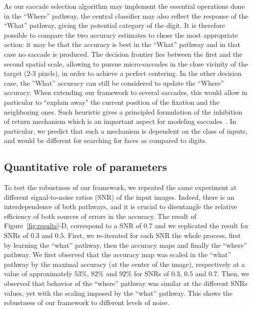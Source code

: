 As our saccade selection algorithm may implement the essential operations done in the ``Where'' pathway, the central classifier may also reflect the response of the ``What'' pathway, giving the potential category of the digit. It is therefore possible to compare the two accuracy estimates to chose the most appropriate action: it may be that the accuracy is best in the ``What'' pathway and in that case no saccade is produced. The decision frontier lies between the first and the second spatial scale, allowing to pursue micro-saccades in the close vicinity of the target (2-3 pixels), in order to achieve a perfect centering.  In the other decision case, the ''What'' accuracy can still be considered to update the ``Where'' accuracy. When extending our framework to several saccades, this would allow in particular to ``explain away" the current position of the fixation and the neighboring ones. Such heuristic gives a principled formulation of the inhibition of return mechanism which is an important aspect for modeling saccades~\citep{Itti01}. In particular, we predict that such a mechanism is dependent on the class of inputs, and would be different for searching for faces as compared to digits. 

\subsection{Quantitative role of parameters}
To test the robustness of our framework, we repeated the same experiment at different signal-to-noise ratios (SNR) of the input images. Indeed, there is an interdependence of both pathways, and it is crucial to disentangle the relative efficiency of both sources of errors in the accuracy.
The result of Figure~\ref{fig:results}-D, correspond to a SNR of $0.7$ and we replicated the result for SNRs of $0.3$ and $0.5$. First, we re-iterated for each SNR the whole process, first by learning the ``what'' pathway, then the accuracy maps and finally the ``where'' pathway. We first observed that the accuracy map was scaled in the ``what'' pathway by the maximal accuracy (at the center of the image), respectively at a value of approximately $53\%$, $82\%$ and $92\%$ for SNRs of $0.3$, $0.5$ and $0.7$. Then, we observed that behavior of the ``where'' pathway was similar at the different SNRs values, yet with the scaling imposed by the ``what'' pathway. This shows the robustness of our framework to different levels of noise.

